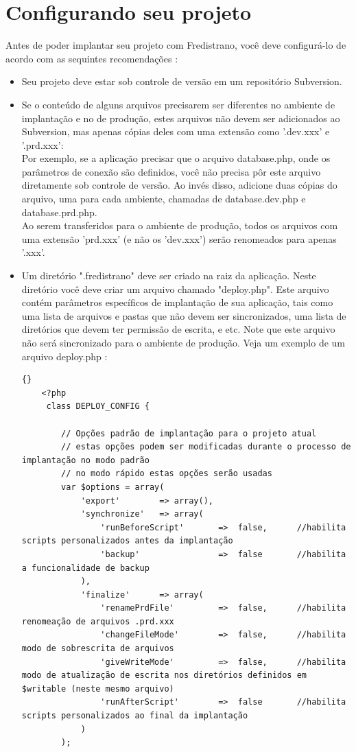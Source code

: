 \documentclass[12pt,a4paper]{report}
\begin{document}
\section{Configurando seu projeto}\label{precimportantes}
Antes de poder implantar seu projeto com Fredistrano, você deve configurá-lo de acordo com as sequintes recomendações :\\
\begin{itemize}
\item Seu projeto deve estar sob controle de versão em um repositório Subversion.\\
\item Se o conteúdo de alguns arquivos precisarem ser diferentes no ambiente de implantação e no de produção, estes arquivos não devem ser adicionados ao Subversion, mas apenas cópias deles com uma extensão como '.dev.xxx' e '.prd.xxx':\\
Por exemplo, se a aplicação precisar que o arquivo database.php, onde os parâmetros de conexão são definidos, você não precisa pôr este arquivo diretamente sob controle de versão.  Ao invés disso, adicione duas cópias do arquivo, uma para cada ambiente, chamadas de database.dev.php e database.prd.php.\\ 
Ao serem transferidos para o ambiente de produção, todos os arquivos com uma extensão 'prd.xxx' (e não os 'dev.xxx') serão renomeados para apenas '.xxx'.
\item Um diretório ".fredistrano" deve ser criado na raiz da aplicação.  Neste diretório você deve criar um arquivo chamado "deploy.php".  Este arquivo contém parâmetros específicos de implantação de sua aplicação, tais como uma lista de arquivos e pastas que não devem ser sincronizados, uma lista de diretórios que devem ter permissão de escrita, e etc.  Note que este arquivo não será sincronizado para o ambiente de produção.  Veja um exemplo de um arquivo deploy.php :\\

\lstset{language=Php}
\lstset{breaklines=true}
\lstset{tabsize=2}
\lstset{commentstyle=\textit}
\begin{lstlisting}[frame=tb]{}
	<?php
	 class DEPLOY_CONFIG {

		// Opções padrão de implantação para o projeto atual
		// estas opções podem ser modificadas durante o processo de implantação no modo padrão
		// no modo rápido estas opções serão usadas
	 	var $options = array(
	 		'export' 		=> array(),
	 		'synchronize'	=> array(
	 		 	'runBeforeScript'		=> 	false, 		//habilita scripts personalizados antes da implantação
	 			'backup'				=> 	false 		//habilita a funcionalidade de backup
	 		),
	 		'finalize'		=> array(
		 		'renamePrdFile' 		=> 	false,		//habilita renomeação de arquivos .prd.xxx
				'changeFileMode' 		=> 	false,		//habilita modo de sobrescrita de arquivos
				'giveWriteMode'			=> 	false,		//habilita modo de atualização de escrita nos diretórios definidos em $writable (neste mesmo arquivo)
	 			'runAfterScript'		=> 	false		//habilita scripts personalizados ao final da implantação
	 		)
	 	);


\end{lstlisting}
\end{itemize}
\end{document}
